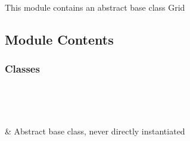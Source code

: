 \documentclass[letterpaper,10pt,english]{sphinxmanual}
\begin{document}
\section{}
\label{\detokenize{autoapi/Grid/index:module-Grid}}\label{\detokenize{autoapi/Grid/index:grid}}\label{\detokenize{autoapi/Grid/index::doc}}
\sphinxAtStartPar
This module contains an abstract base class Grid


\subsection{Module Contents}
\label{\detokenize{autoapi/Grid/index:module-contents}}

\subsubsection{Classes}
\label{\detokenize{autoapi/Grid/index:classes}}

\begin{savenotes}\sphinxatlongtablestart\begin{longtable}[c]{}
\hline

\endfirsthead

%
{}\\
\hline

\endhead

\hline
{}\\
\endfoot

\endlastfoot

\sphinxAtStartPar
{\hyperref[\detokenize{autoapi/Grid/index:Grid.Grid}]{}}
&
\sphinxAtStartPar
Abstract base class, never directly instantiated
\\
\hline
\end{longtable}\sphinxatlongtableend\end{savenotes}
\end{document}

